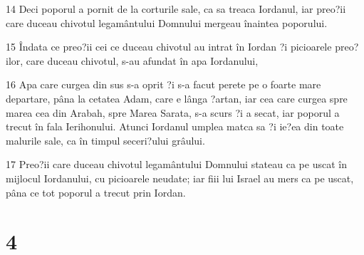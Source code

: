 \par 14 Deci poporul a pornit de la corturile sale, ca sa treaca Iordanul, iar preo?ii care duceau chivotul legamântului Domnului mergeau înaintea poporului.
\par 15 Îndata ce preo?ii cei ce duceau chivotul au intrat în Iordan ?i picioarele preo?ilor, care duceau chivotul, s-au afundat în apa Iordanului,
\par 16 Apa care curgea din sus s-a oprit ?i s-a facut perete pe o foarte mare departare, pâna la cetatea Adam, care e lânga ?artan, iar cea care curgea spre marea cea din Arabah, spre Marea Sarata, s-a scurs ?i a secat, iar poporul a trecut în fala Ierihonului. Atunci Iordanul umplea matca sa ?i ie?ea din toate malurile sale, ca în timpul seceri?ului grâului.
\par 17 Preo?ii care duceau chivotul legamântului Domnului stateau ca pe uscat în mijlocul Iordanului, cu picioarele neudate; iar fiii lui Israel au mers ca pe uscat, pâna ce tot poporul a trecut prin Iordan.

\chapter{4}

